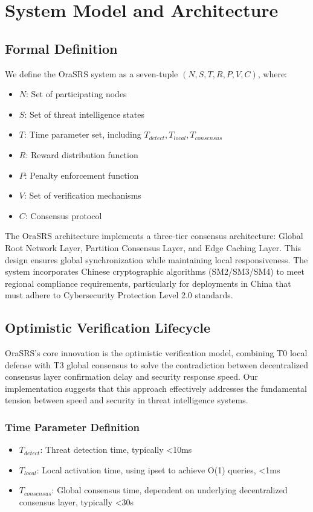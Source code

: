 \documentclass[12pt]{article}
\begin{document}
\section{System Model and Architecture}

\subsection{Formal Definition}

We define the OraSRS system as a seven-tuple $(N, S, T, R, P, V, C)$, where:
\begin{itemize}
\item $N$: Set of participating nodes
\item $S$: Set of threat intelligence states
\item $T$: Time parameter set, including $T_{detect}, T_{local}, T_{consensus}$
\item $R$: Reward distribution function
\item $P$: Penalty enforcement function
\item $V$: Set of verification mechanisms
\item $C$: Consensus protocol
\end{itemize}

The OraSRS architecture implements a three-tier consensus architecture: Global Root Network Layer, Partition Consensus Layer, and Edge Caching Layer. This design ensures global synchronization while maintaining local responsiveness. The system incorporates Chinese cryptographic algorithms (SM2/SM3/SM4) to meet regional compliance requirements, particularly for deployments in China that must adhere to Cybersecurity Protection Level 2.0 standards.

\subsection{Optimistic Verification Lifecycle}

OraSRS's core innovation is the optimistic verification model, combining T0 local defense with T3 global consensus to solve the contradiction between decentralized consensus layer confirmation delay and security response speed. Our implementation suggests that this approach effectively addresses the fundamental tension between speed and security in threat intelligence systems.

\subsubsection{Time Parameter Definition}
\begin{itemize}
\item $T_{detect}$: Threat detection time, typically <10ms
\item $T_{local}$: Local activation time, using ipset to achieve O(1) queries, <1ms
\item $T_{consensus}$: Global consensus time, dependent on underlying decentralized consensus layer, typically <30s
\end{itemize}
\end{document}
